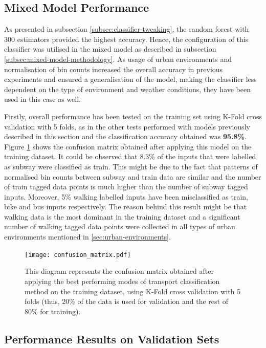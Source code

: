 \documentclass[bsc,frontabs,twoside,singlespacing, parskip,deptreport]{infthesis}     %
\begin{document}
\subsection{Mixed Model Performance}

As presented in subsection \ref{subsec:classifier-tweaking}, the random forest with 300 estimators provided the highest accuracy. Hence, the configuration of this classifier was utilised in the mixed model as described in subsection \ref{subsec:mixed-model-methodology}. As usage of urban environments and normalisation of bin counts increased the overall accuracy in previous experiments and ensured a generalisation of the model, making the classifier less dependent on the type of environment and weather conditions, they have been used in this case as well. 

Firstly, overall performance has been tested on the training set using K-Fold cross validation with 5 folds, as in the other tests performed with models previously described in this section and the classification accuracy obtained was \textbf{95.8\%}. Figure \ref{fig:confusion_matrix} shows the confusion matrix obtained after applying this model on the training dataset. It could be observed that 8.3\% of the inputs that were labelled as subway were classified as train. This might be due to the fact that patterns of normalised bin counts between subway and train data are similar and the number of train tagged data points is much higher than the number of subway tagged inputs. Moreover, 5\% walking labelled inputs have been misclassified as train, bike and bus inputs respectively. The reason behind this result might be that walking data is the most dominant in the training dataset and a significant number of walking tagged data points were collected in all types of urban environments mentioned in \ref{sec:urban-environments}.

\begin{figure}[h!]
  \center
  \texttt{[image: confusion\_matrix.pdf]}
  \caption{This diagram represents the confusion matrix obtained after applying the best performing modes of transport classification method on the training dataset, using K-Fold cross validation with 5 folds (thus, 20\% of the data is used for validation and the rest of 80\% for training).}
  \label{fig:confusion_matrix}
\end{figure}


\subsection{Performance Results on Validation Sets}
\end{document}
